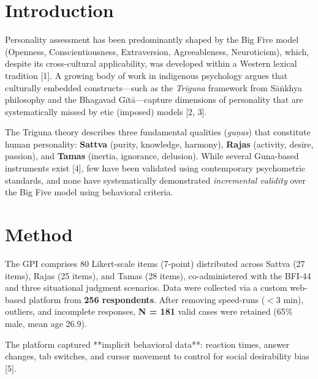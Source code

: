 \documentclass[a4paper,11pt]{article}
\begin{document}
\begin{abstract}
These findings establish the GPI as a psychometrically robust instrument that captures \textbf{statistically distinct} dimensions of personality.

\bigskip
\textbf{Keywords:} Triguna Theory, Personality Assessment, Psychometric Validation, Indian Knowledge Systems, Incremental Validity, Implicit Behavioral Measures
\end{abstract}

\section{Introduction}

Personality assessment has been predominantly shaped by the Big Five model (Openness, Conscientiousness, Extraversion, Agreeableness, Neuroticism), which, despite its cross-cultural applicability, was developed within a Western lexical tradition [1]. A growing body of work in indigenous psychology argues that culturally embedded constructs—such as the \textit{Triguna} framework from Sāṅkhya philosophy and the Bhagavad Gītā—capture dimensions of personality that are systematically missed by etic (imposed) models [2, 3].

The Triguna theory describes three fundamental qualities (\textit{guṇas}) that constitute human personality: \textbf{Sattva} (purity, knowledge, harmony), \textbf{Rajas} (activity, desire, passion), and \textbf{Tamas} (inertia, ignorance, delusion). While several Guna-based instruments exist [4], few have been validated using contemporary psychometric standards, and none have systematically demonstrated \textit{incremental validity} over the Big Five model using behavioral criteria.

\section{Method}

The GPI comprises 80 Likert-scale items (7-point) distributed across Sattva (27 items), Rajas (25 items), and Tamas (28 items), co-administered with the BFI-44 and three situational judgment scenarios. Data were collected via a custom web-based platform from \textbf{256 respondents}. After removing speed-runs ($<3$ min), outliers, and incomplete responses, \textbf{N = 181} valid cases were retained (65\% male, mean age 26.9).

The platform captured **implicit behavioral data**: reaction times, answer changes, tab switches, and cursor movement to control for social desirability bias [5].
\end{document}
